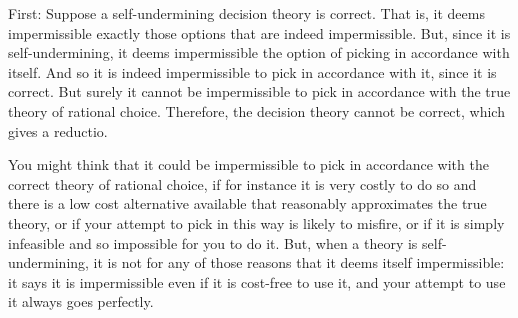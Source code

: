 \documentclass[a4paper]{article}
\newcommand{\todoinfo}[2][]{\todo[inline,{#1}]{#2}}
\renewcommand{\color}[1]{}
\newenvironment{colored}[1]{\leavevmode\color{#1}}{}
\newenvironment{CCM rewritten}
{\begingroup\color{blue}} %
{\endgroup}              %
\begin{document}
%	
%
%


	
First: Suppose a self-undermining decision theory is correct. That is, it deems impermissible exactly those options that are indeed impermissible. But, since it is self-undermining, it deems impermissible the option of picking in accordance with itself. And so it is indeed impermissible to pick in accordance with it, since it is correct. But surely it cannot be impermissible to pick in accordance with the true theory of rational choice. Therefore, the decision theory cannot be correct, which gives a reductio.

You might think that it could be impermissible to pick in accordance with the correct theory of rational choice, if for instance it is very costly to do so and there is a low cost alternative available that reasonably approximates the true theory, or if your attempt to pick in this way is likely to misfire, or if it is simply infeasible and so impossible for you to do it. But, when a theory is self-undermining, it is not for any of those reasons that it deems itself impermissible: it says it is impermissible even if it is cost-free to use it, and your attempt to use it always goes perfectly.
\end{document}
